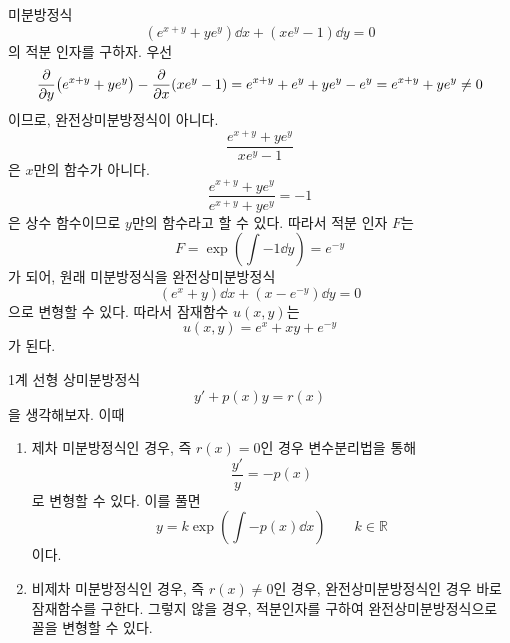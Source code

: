 \documentclass[../engineering_mathematics_lecture_note.tex]{subfiles}
\begin{document}
\begin{example}
    미분방정식
    \begin{equation*}
        (e^{x + y} + y e^y) \dd{x} + (xe^y - 1) \dd{y} = 0
    \end{equation*}
    의 적분 인자를 구하자.
    우선
    \begin{equation*}
        \pdv{y}(e^{x + y} + ye^y) - \pdv{x}(xe^y - 1) = e^{x + y} + e^y + ye^y - e^y = e^{x + y} + ye^y \neq 0
    \end{equation*}
    이므로, 완전상미분방정식이 아니다.
    \begin{equation*}
        \frac{e^{x + y} + y e^y}{xe^y - 1}
    \end{equation*}
    은 $x$만의 함수가 아니다.
    \begin{equation*}
        \frac{e^{x + y} + y e^y}{e^{x + y} + ye^y} = -1
    \end{equation*}
    은 상수 함수이므로 $y$만의 함수라고 할 수 있다.
    따라서 적분 인자 $F$는
    \begin{equation*}
        F = \exp(\int{-1 \dd{y}}) = e^{-y}
    \end{equation*}
    가 되어, 원래 미분방정식을 완전상미분방정식
    \begin{equation*}
        (e^x + y) \dd{x} + (x - e^{-y}) \dd{y} = 0
    \end{equation*}
    으로 변형할 수 있다.
    따라서 잠재함수 $u(x, y)$는
    \begin{equation*}
        u(x, y) = e^x + xy + e^{-y}
    \end{equation*}
    가 된다.
\end{example}

1계 선형 상미분방정식
\begin{equation*}
    y' + p(x) y = r(x)
\end{equation*}
을 생각해보자.
이때
\begin{enumerate}
    \item 제차 미분방정식인 경우, 즉 $r(x) = 0$인 경우 변수분리법을 통해
        \begin{equation*}
            \frac{y'}{y} = -p(x)
        \end{equation*}
        로 변형할 수 있다.
        이를 풀면
        \begin{equation*}
            y = k \exp(\int{-p(x) \dd{x}}) \qquad k \in \mathbb R
        \end{equation*}
        이다.
    \item 비제차 미분방정식인 경우, 즉 $r(x) \neq 0$인 경우, 완전상미분방정식인 경우 바로 잠재함수를 구한다.
        그렇지 않을 경우, 적분인자를 구하여 완전상미분방정식으로 꼴을 변형할 수 있다.
\end{enumerate}
\end{document}
